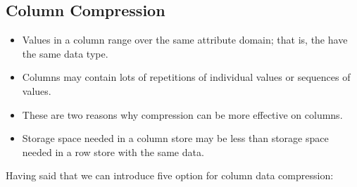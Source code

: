 \subsection{Column Compression}
\begin{itemize}
    \item Values in a column range over the same attribute domain; that is, the have the same data type.
    \item Columns may contain lots of repetitions of individual values or sequences of values.
    \item These are two reasons why compression can be more effective on columns.
    \item Storage space needed in a column store may be less than storage space needed in a row store with the same data.
\end{itemize}
\newpage
 Having said that we can introduce five option for column data compression: 
